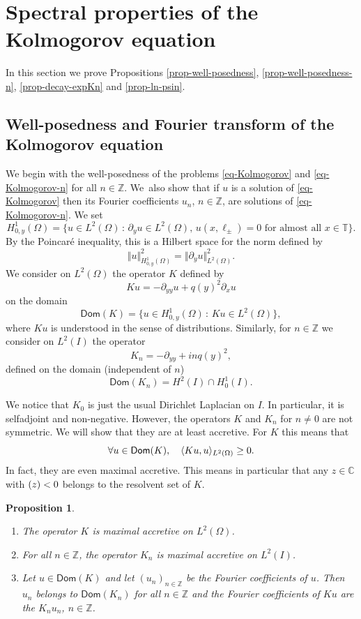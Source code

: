 \documentclass[11pt]{article}
\newcommand{\Subsection}{\subsection}
\newcommand{\skpt}{\smallskip}
\numberwithin{equation}{section}
\theoremstyle{plain}
\newtheorem{proposition}[theorem]{Proposition}
\theoremstyle{definition}
\newcommand{\nr}[1]{\Vert #1\Vert}
\newcommand{\set}[1]{\{ #1\}}
\newcommand{\1}{\mathds 1}
\newcommand{\st}{\,:\,}
\let\Re\relax
\DeclareMathOperator{\Re}{\mathsf{Re}\mkern2mu}
\newcommand{\Dom}{\mathsf{Dom}}
\def\C{\mathbb{C}}
\newcommand{\Z}{\mathbb{Z}}
\newcommand{\T}{\mathbb{T}}
\let\O\Omega
\begin{document}
\section{Spectral properties of the Kolmogorov equation} \label{sec-spectral}

In this section we prove Propositions \ref{prop-well-posedness}, \ref{prop-well-posedness-n}, \ref{prop-decay-expKn} and \ref{prop-ln-psin}.

\Subsection{Well-posedness and Fourier transform of the Kolmogorov equation} \label{sec-wellposedness-proof}

We begin with the well-posedness of the problems \eqref{eq-Kolmogorov} and \eqref{eq-Kolmogorov-n} for all $n \in \Z$. We~also show that if $u$ is a solution of \eqref{eq-Kolmogorov} then its Fourier coefficients $u_n$, $n\in\Z$, are solutions of \eqref{eq-Kolmogorov-n}. We set
\[
H^1_{0,y}(\O) = \bigl\{u \in L^2(\O) \st \partial_y u \in L^2(\O),\, u(x ,\ell_\pm) = 0 \text{ for almost all } x \in \T \bigr\}.
\]
By the Poincaré inequality, this is a Hilbert space for the norm defined by
\[
\nr{u}_{H^1_{0,y}(\O)}^2 = \nr{\partial_y u}_{L^2(\O)}^2.
\]
We consider on $L^2(\O)$ the operator $K$ defined by
\[
Ku = -\partial_{yy} u + q(y)^2 \partial_x u
\]
on the domain
\[
\Dom(K) = \set{u \in H^1_{0,y}(\O) \st K u \in L^2(\O)},
\]
where $Ku$ is understood in the sense of distributions. Similarly, for $n \in \Z$ we consider on $L^2(I)$ the operator
\begin{equation} \label{def-Kn}
K_n = -\partial_{yy} + i n q(y)^2,
\end{equation}
defined on the domain (independent of $n$)
\begin{equation} \label{dom-Kn}
\Dom(K_n) = H^2(I) \cap H_0^1(I).
\end{equation}

We notice that $K_0$ is just the usual Dirichlet Laplacian on $I$. In particular, it is selfadjoint and non-negative. However, the operators $K$ and $K_n$ for $n \neq 0$ are not symmetric. We will show that they are at least accretive. For $K$ this means that
\[
\forall u \in \Dom(K), \quad \Re \innp{K u}{u}_{L^2(\O)} \geq 0.
\]
In fact, they are even maximal accretive. This means in particular that any $z \in \C$ with $\Re(z) < 0$ belongs to the resolvent set of $K$.

\skpt
\begin{proposition}
\begin{enumerate}
\item The operator $K$ is maximal accretive on $L^2(\O)$.
\item For all $n \in \Z$, the operator $K_n$ is maximal accretive on $L^2(I)$.
\item Let $u \in \Dom(K)$ and let $(u_n)_{n \in \Z}$ be the Fourier coefficients of $u$. Then $u_n$ belongs to $\Dom(K_n)$ for all $n \in \Z$ and the Fourier coefficients of $Ku$ are the $K_n u_n$, $n \in \Z$.
\end{enumerate}
\label{prop-K-Kn}
\end{proposition}
\end{document}
